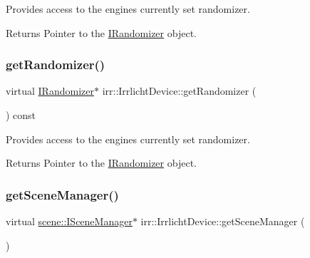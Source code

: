 Provides access to the engine\textquotesingle{}s currently set randomizer. 

\begin{DoxyReturn}{Returns}
Pointer to the \hyperlink{classirr_1_1IRandomizer}{I\+Randomizer} object. 
\end{DoxyReturn}
\mbox{\label{classirr_1_1IrrlichtDevice_aaba0cb18cac48e381d841ad763c7ea8b}} 
\subsubsection{\texorpdfstring{get\+Randomizer()}{getRandomizer()}\hspace{0.1cm}{\footnotesize\ttfamily [3/3]}}
{\footnotesize\ttfamily virtual \hyperlink{classirr_1_1IRandomizer}{I\+Randomizer}$\ast$ irr\+::\+Irrlicht\+Device\+::get\+Randomizer (\begin{DoxyParamCaption}{ }\end{DoxyParamCaption}) const\hspace{0.3cm}{\ttfamily [pure virtual]}}



Provides access to the engine\textquotesingle{}s currently set randomizer. 

\begin{DoxyReturn}{Returns}
Pointer to the \hyperlink{classirr_1_1IRandomizer}{I\+Randomizer} object. 
\end{DoxyReturn}
\mbox{\label{classirr_1_1IrrlichtDevice_a891b503ff4d5041296d88f23f97d7b3d}} 
\subsubsection{\texorpdfstring{get\+Scene\+Manager()}{getSceneManager()}\hspace{0.1cm}{\footnotesize\ttfamily [1/3]}}
{\footnotesize\ttfamily virtual \hyperlink{classirr_1_1scene_1_1ISceneManager}{scene\+::\+I\+Scene\+Manager}$\ast$ irr\+::\+Irrlicht\+Device\+::get\+Scene\+Manager (\begin{DoxyParamCaption}{ }\end{DoxyParamCaption})\hspace{0.3cm}{\ttfamily [pure virtual]}}



